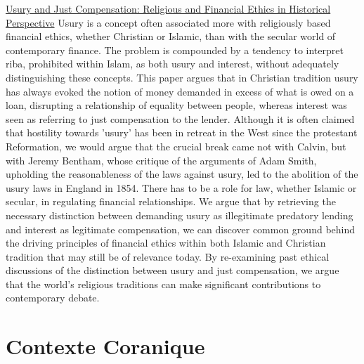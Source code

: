 \href{https://icp.summon.serialssolutions.com/2.0.0/link/0/eLvHCXMwnV1Lj9MwEB61e0BIqwXKrggsyJe9rEhJGidO9rI81MChhwroiUPk-KEt0CrbhxD_nhknaWhRLxwcR8pETjLO-LP9zQxANBoG_oFNMDYT2cjgAGF4XEahQtRPQ11spUBES37D44_ZNOdfPkeTHqStawyxLB1N0G3qI14qf5o3OGojyI75bXXvU_oo2mZtcmmQLUZI4Hr3-84i78f45u3uZu1Ch5jBp3l1FtLJ3vhUUxSxXpnKqP3NUtGY1PwRfNt58qhqONeLnSf1QWjH_3mjx3DWQFP2ru5LT6BnlgN40DLjB9CfyF9PYTZboxqYXGpGmcAYGRScCjsF37CG4bxdO4G8DefBalo9my9ZF5eETTtHz3OY5eOvHz75TW4GnwDIxk-1sFGiuI6VUok0QnKtlOCpDU2cIajUJeWcyLhKAi04XrUmQ6gQSWtNmdroAk4lcfiXG-frp58B04g3EmUEVyrgSkZSpHFQZqNERUlcBsqD61Y1RVXH4ii6qMukx4JYeqTHIvDgwn3mnWT7jT1467S5u_BDVt_L7drgv11gmyM8_MZCi7hYzbGEWCpXh3Fxt1l48LrtCH89CLVPCzRFo6f6QSptPbj6R9wJ1vdgi6GTPSInDuWeH3u1F_CwXnomYtElnGxWW_MS-tgrX7kf4g9iMhFq}{
Usury and Just Compensation: Religious and Financial Ethics in Historical Perspective}
Usury is a concept often associated more with religiously based financial ethics, whether Christian or Islamic, than with the secular world of contemporary finance. The problem is compounded by a tendency to interpret riba, prohibited within Islam, as both usury and interest, without adequately distinguishing these concepts. This paper argues that in Christian tradition usury has always evoked the notion of money demanded in excess of what is owed on a loan, disrupting a relationship of equality between people, whereas interest was seen as referring to just compensation to the lender. Although it is often claimed that hostility towards 'usury' has been in retreat in the West since the protestant Reformation, we would argue that the crucial break came not with Calvin, but with Jeremy Bentham, whose critique of the arguments of Adam Smith, upholding the reasonableness of the laws against usury, led to the abolition of the usury laws in England in 1854. There has to be a role for law, whether Islamic or secular, in regulating financial relationships. We argue that by retrieving the necessary distinction between demanding usury as illegitimate predatory lending and interest as legitimate compensation, we can discover common ground behind the driving principles of financial ethics within both Islamic and Christian tradition that may still be of relevance today. By re-examining past ethical discussions of the distinction between usury and just compensation, we argue that the world's religious traditions can make significant contributions to contemporary debate.
\section{Contexte Coranique}

